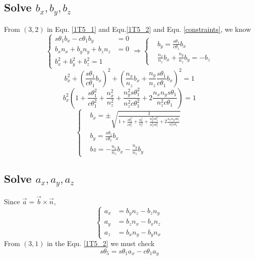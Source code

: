 \documentclass[utf8]{article}
\begin{document}
\subsection{Solve $b_x, b_y, b_z$}
From $(3, 2)$ in Equ. \ref{1T5_1} and Equ.\ref{1T5_2} and Equ. \ref{constraints}, we know
$$\left\{
\begin{aligned}
s\theta_1b_x - c\theta_1b_y &= 0\\
b_xn_x + b_yn_y + b_zn_z &= 0\\
b_x^2 + b_y^2 + b_z^2 = 1
\end{aligned}
\right.
\Rightarrow 
\left\{
\begin{aligned}
&b_y = \frac{s\theta_1}{c\theta_1}b_x\\
&\frac{n_x}{n_z}b_x + \frac{n_y}{n_z}b_y = -b_z
\end{aligned}
\right.$$
$$b_x^2 + \left(\frac{s\theta_1}{c\theta_1}b_x\right)^2 + \left(\frac{n_x}{n_z}b_x + \frac{n_y}{n_z}\frac{s\theta_1}{c\theta_1}b_x\right)^2 = 1$$
$$b_x^2\left( 1 + \frac{s\theta_1^2}{c\theta_1^2} + \frac{n_x^2}{n_z^2} + \frac{n_y^2s\theta_1^2}{n_z^2c\theta_1^2} + 2\frac{n_xn_ys\theta_1}{n_z^2c\theta_1} \right) = 1$$
\begin{equation}
\left\{
\begin{aligned}
&b_x =\pm \sqrt{\frac{1}{1 + \frac{s\theta_1^2}{c\theta_1^2} + \frac{n_x^2}{n_z^2} + \frac{n_y^2s\theta_1^2}{n_z^2c\theta_1^2} + 2\frac{n_xn_ys\theta_1}{n_z^2c\theta_1}}}\\
&b_y = \frac{s\theta_1}{c\theta_1}b_x\\
&bz = -\frac{n_x}{n_z}b_x - \frac{n_y}{n_z}b_y
\end{aligned}
\right.
\end{equation}

\subsection{Solve $a_x, a_y, a_z$}
Since $\vec{a} = \vec{b}\times \vec{n}$, 
\begin{equation}
\left\{
\begin{aligned}
a_x &= b_yn_z - b_zn_y\\
a_y &= b_zn_x - b_xn_z\\
a_z &= b_xn_y - b_yn_x
\end{aligned}
\right.
\end{equation}
From $(3, 1)$ in the Equ. \ref{1T5_2} we must check
$$s\theta_5 = s\theta_1a_x - c\theta_1 a_y$$
\end{document}
